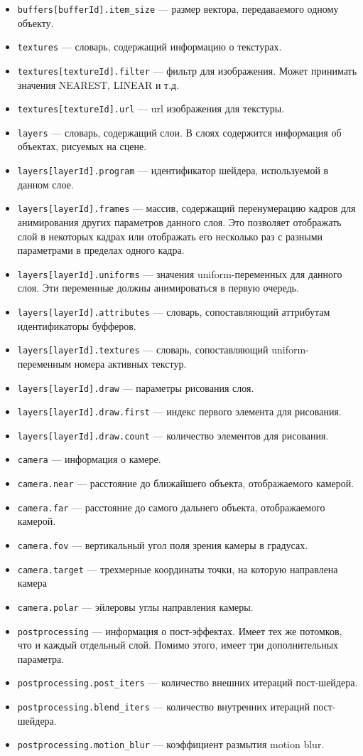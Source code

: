 \begin{itemize}
\item \texttt{buffers[bufferId].item\_size} --- размер вектора, передаваемого одному объекту.
\item \texttt{textures} --- словарь, содержащий информацию о текстурах.
\item \texttt{textures[textureId].filter} --- фильтр для изображения. Может принимать значения NEAREST, LINEAR и т.д.
\item \texttt{textures[textureId].url} --- url изображения для текстуры.
\item \texttt{layers} --- словарь, содержащий слои. В слоях содержится информация об объектах, рисуемых на сцене.
\item \texttt{layers[layerId].program} --- идентификатор шейдера, используемой в данном слое.
\item \texttt{layers[layerId].frames} --- массив, содержащий перенумерацию кадров для анимирования других параметров данного слоя. Это позволяет отображать слой в некоторых кадрах или отображать его несколько раз с разными параметрами в пределах одного кадра. 
\item \texttt{layers[layerId].uniforms} --- значения uniform-переменных для данного слоя. Эти переменные должны анимироваться в первую очередь. 
\item \texttt{layers[layerId].attributes} --- словарь, сопоставляющий аттрибутам идентификаторы буфферов.
\item \texttt{layers[layerId].textures} --- словарь, сопоставляющий uniform-переменным номера активных текстур.
\item \texttt{layers[layerId].draw} --- параметры рисования слоя.
\item \texttt{layers[layerId].draw.first} --- индекс первого элемента для рисования.
\item \texttt{layers[layerId].draw.count} --- количество элементов для рисования.
\item \texttt{camera} --- информация о камере.
\item \texttt{camera.near} --- расстояние до ближайшего объекта, отображаемого камерой.
\item \texttt{camera.far} --- расстояние до самого дальнего объекта, отображаемого камерой.
\item \texttt{camera.fov} --- вертикальный угол поля зрения камеры в градусах.
\item \texttt{camera.target} --- трехмерные координаты точки, на которую направлена камера
\item \texttt{camera.polar} --- эйлеровы углы направления камеры.
\item \texttt{postprocessing} --- информация о пост-эффектах. Имеет тех же потомков, что и каждый отдельный слой. Помимо этого, имеет три дополнительных параметра.
\item \texttt{postprocessing.post\_iters} --- количество внешних итераций пост-шейдера. 
\item \texttt{postprocessing.blend\_iters} --- количество внутренних итераций пост-шейдера.
\item \texttt{postprocessing.motion\_blur} --- коэффициент размытия motion blur.
\end{itemize}




